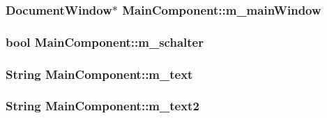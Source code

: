 \begin{CompactItemize}
\hypertarget{class_main_component_0b3169c9c56934a40ddd86da63ed718f}{
\subsubsection[{m\_\-mainWindow}]{\setlength{\rightskip}{0pt plus 5cm}DocumentWindow$\ast$ {\bf MainComponent::m\_\-mainWindow}}}
\label{class_main_component_0b3169c9c56934a40ddd86da63ed718f}


\hypertarget{class_main_component_b98d304d55eabd66ae7bbc0ac3a1a424}{
\subsubsection[{m\_\-schalter}]{\setlength{\rightskip}{0pt plus 5cm}bool {\bf MainComponent::m\_\-schalter}}}
\label{class_main_component_b98d304d55eabd66ae7bbc0ac3a1a424}


\hypertarget{class_main_component_6f2ff91585d36c8b87e8a7429d792336}{
\subsubsection[{m\_\-text}]{\setlength{\rightskip}{0pt plus 5cm}String {\bf MainComponent::m\_\-text}}}
\label{class_main_component_6f2ff91585d36c8b87e8a7429d792336}


\hypertarget{class_main_component_5a12f8a9b7495d7525ed8973a06f7110}{
\subsubsection[{m\_\-text2}]{\setlength{\rightskip}{0pt plus 5cm}String {\bf MainComponent::m\_\-text2}}}
\label{class_main_component_5a12f8a9b7495d7525ed8973a06f7110}



\end{CompactItemize}
